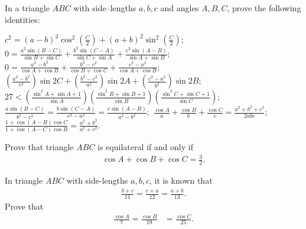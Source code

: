 \documentclass[12pt,a4paper]{memoir}
\theoremstyle{definition}
\begin{document}
\begin{question}[name={Exercises in Law of Sines and Law of Cosines}]
	In a triangle $ABC$ with side--lengths $a,b,c$ and angles $A,B,C$, prove the following identities:
	\begin{tasks}
		\task $\displaystyle c^2 = (a-b)^2\cos^2\left(\frac{C}{2}\right)+(a+b)^2\sin^2\left(\frac{C}{2}\right);$
		\task$\displaystyle  0=  \frac{a^2\sin(B-C)}{\sin B + \sin C} + \frac{b^2\sin(C-A)}{\sin C + \sin A} + \frac{c^2\sin(A-B)}{\sin A + \sin B};$
		\task $\displaystyle  0=  \frac{a^2-b^2}{\cos A + \cos B} + \frac{b^2-c^2}{\cos B + \cos C} + \frac{c^2-a^2}{\cos A + \cos B};$
		\task $\displaystyle \left(\frac{a^2-b^2}{c^2}\right)\sin 2C + \left(\frac{b^2-c^2}{a^2}\right)\sin 2A + \left(\frac{c^2-a^2}{b^2}\right)\sin 2B;$
		\task $\displaystyle 27 < \left(\frac{\sin^2 A + \sin A + 1}{\sin A}\right)\left(\frac{\sin^2 B + \sin B + 1}{\sin B}\right)\left(\frac{\sin^2 C + \sin C + 1}{\sin C}\right);$
		\task $\displaystyle \frac{a\sin(B-C)}{b^2-c^2} = \frac{b\sin(C-A)}{c^2-a^2} = \frac{c\sin(A-B)}{a^2-b^2};$
		\task $\displaystyle 
			\frac{\cos A}{a}+\frac{\cos B}{b}+\frac{\cos C}{c} = \frac{a^2+b^2+c^2}{2abc};$
		\task $\displaystyle \frac{1+\cos(A-B)\cos C}{1+\cos(A-C)\cos B} = \frac{a^2+b^2}{a^2+c^2}.$
	\end{tasks}
\end{question}

\begin{question}[name=1984 IIT JEE]
	Prove that triangle $ABC$ is equilateral if and only if
	\begin{align*}
		\cos A + \cos B + \cos C = \frac{3}{2}.
	\end{align*}
\end{question}

\begin{question}[name=1984 IIT JEE]
	In triangle $ABC$ with side-lengths $a,b,c$, it is known that
	\begin{align*}
		\frac{b+c}{11}=\frac{c+a}{12}=\frac{a+b}{13}.
	\end{align*}
	Prove that
	\begin{align*}
		\frac{\cos A}{7} = \frac{\cos B}{19} &= \frac{\cos C}{25}.
	\end{align*}
\end{question}
\end{document}
